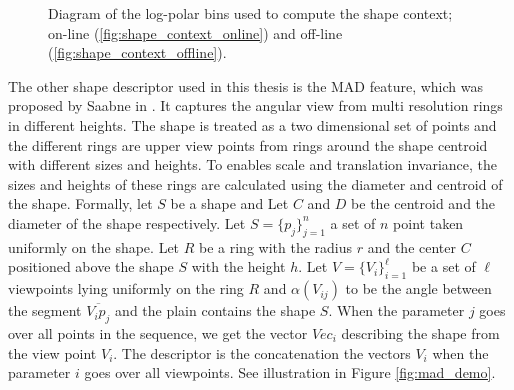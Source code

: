 \begin{figure}
\centering
{}
\caption{Diagram of the log-polar bins used to compute the shape context; on-line (\ref{fig:shape_context_online}) and off-line (\ref{fig:shape_context_offline}).}
\label{fig:shape_context_demo}
\end{figure}

\iftoggle{edit-mode}{\hspace{0pt}\marginpar{MAD}}{}
The other shape descriptor used in this thesis is the MAD feature, which was proposed by Saabne in \cite{saabni2013multi}. 
It captures the angular view from multi resolution rings in different heights. 
The shape is treated as a two dimensional set of points and the different rings are upper view points from rings around the shape centroid with different sizes and heights. 
To enables scale and translation invariance, the sizes and heights of these rings are calculated using the diameter and centroid of the shape.
Formally, let $S$ be a shape and Let $C$ and $D$ be the centroid and the diameter of the shape respectively. 
Let $S = \{p_j\}_{j = 1}^n$ a set of $n$ point taken uniformly on the shape. 
Let $R$ be a ring with the radius $r$ and the center $C$ positioned above the shape $S$ with the height $h$. 
Let $V = \{V_i\}_{i = 1}^\ell$ be a set of $\ell$ viewpoints lying uniformly on the ring $R$ and $\alpha(V_{ij})$ to be the angle between the segment $\overline {{V_i}{p_j}}$ and the plain contains the shape $S$. 
When the parameter $j$ goes over all points in the sequence, we get the vector $Vec_i$ describing the shape from the view point $V_i$.
The descriptor is the concatenation the vectors $V_i$ when the parameter $i$ goes over all viewpoints. 
See illustration in Figure \ref{fig:mad_demo}.

